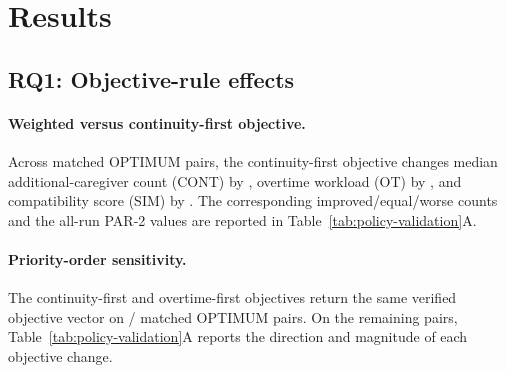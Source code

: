 
\section{Results}
\label{sec:results}


\subsection{RQ1: Objective-rule effects}
\label{sec:rq1}


\paragraph{Weighted versus continuity-first objective.}
Across  matched OPTIMUM pairs, the continuity-first
objective changes median additional-caregiver count (CONT) by
, overtime workload (OT) by , and
compatibility score (SIM) by .  The corresponding
improved/equal/worse
counts and the all-run PAR-2 values are reported in
Table~\ref{tab:policy-validation}A.

\paragraph{Priority-order sensitivity.}
The continuity-first and overtime-first objectives return the same verified
objective vector on
/ matched OPTIMUM pairs.  On the
remaining pairs, Table~\ref{tab:policy-validation}A reports the direction and
magnitude of each objective change.

